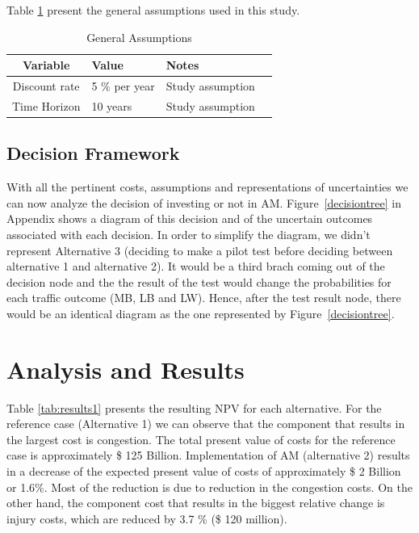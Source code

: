 \documentclass[11pt, letterpaper]{article}
\begin{document}
Table \ref{tab:assumptions} present the general assumptions used in this study.

\begin{table}[h]
\caption{General Assumptions}
\centering
\renewcommand{\arraystretch}{1.1}
\begin{tabular}{c l l l}
\hline
Variable 							& Value 				& Notes 			\\\hline\hline
Discount rate						& 5 \% per year			& Study assumption		\\
Time Horizon						& 10 years			& Study assumption		\\\hline
\end{tabular}
\label{tab:assumptions}
\end{table}%

\subsection{Decision Framework}

With all the pertinent costs, assumptions and representations of uncertainties we can now analyze
the decision of investing or not in AM.  Figure~\ref{decisiontree} in Appendix shows a diagram of this decision and of the
uncertain outcomes associated with each decision. In order to simplify the diagram, we didn't represent
Alternative 3 (deciding to make a pilot test before deciding between alternative 1 and alternative 2). It would be a
third brach coming out of the decision node and the the result of the test would change the probabilities for each
traffic outcome (MB, LB and LW). Hence, after the test result node, there would be an identical diagram as the one represented
by Figure~\ref{decisiontree}.

\section{Analysis and Results} \label{results}

Table \ref{tab:results1} presents the resulting NPV for each alternative. For the reference case (Alternative 1) we can observe that the component that results in the largest cost is congestion. The total present value of costs for the reference case is approximately \$ 125 Billion. Implementation of AM (alternative 2) results in a decrease of the expected present value of costs of approximately \$ 2 Billion or 1.6\%. Most of the reduction is due to reduction in the congestion costs. On the other hand, the component cost that results in the biggest relative change is injury costs, which are reduced by 3.7 \% (\$ 120 million).
\end{document}
